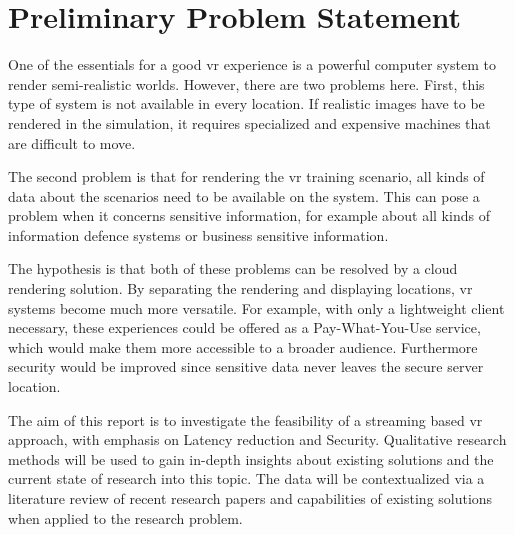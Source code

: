 \section{Preliminary Problem Statement}
One of the essentials for a good \acrfull{vr} experience is a powerful computer system to render semi-realistic
worlds. However, there are two problems here. First, this type of system is not available in every location.
If realistic images have to be rendered in the simulation, it requires specialized and expensive machines that are difficult to move. 

The second problem is that for rendering the \acrshort{vr} training scenario, all kinds of data about the scenarios need to be available on the system. 
This can pose a problem when it concerns sensitive information, for example about all kinds of information defence systems or business sensitive information.


The hypothesis is that both of these problems can be resolved by a cloud rendering solution. By separating the rendering and displaying locations, \acrshort{vr} systems become much more versatile. For example, with only a lightweight client necessary, these experiences could be offered as a Pay-What-You-Use service, which would make them more accessible to a broader audience. Furthermore security would be improved since sensitive data never leaves the secure server location.


The aim of this report is to investigate the feasibility of a streaming based \acrshort{vr} approach, with emphasis on Latency reduction and Security.
Qualitative research methods will be used to gain in-depth insights about existing solutions and the current state of research into this topic.
The data will be contextualized via a literature review of recent research papers and capabilities of existing solutions when applied to the research problem.